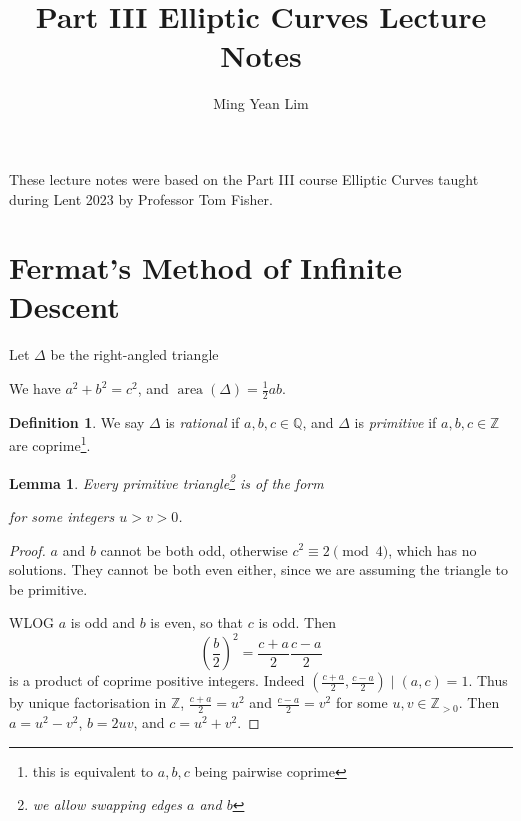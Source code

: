 \documentclass[11pt]{article}
\title{Part III Elliptic Curves Lecture Notes}
\author{Ming Yean Lim}
\theoremstyle{definition}
\newtheorem*{definition*}{Definition}
\theoremstyle{plain}
\newtheorem{lemma}[definition]{Lemma}
\theoremstyle{remark}
\DeclareMathOperator{\area}{area}
\newcommand{\ZZ}{\mathbb{Z}}
\newcommand{\QQ}{\mathbb{Q}}
\begin{document}
\maketitle

\noindent These lecture notes were based on the Part III course Elliptic Curves taught during Lent 2023 by Professor Tom Fisher.

\tableofcontents

\newcommand{\sectionbreak}{\clearpage}

\section{Fermat's Method of Infinite Descent}

Let $\Delta$ be the right-angled triangle
\begin{center}
\end{center}
We have $a^2 + b^2 = c^2$, and $\area(\Delta) = \frac{1}{2} a b$.

\begin{definition*}
    We say $\Delta$ is \emph{rational} if $a, b, c \in \QQ$, and $\Delta$ is \emph{primitive} if $a, b, c \in \ZZ$ are coprime\footnote{this is equivalent to $a, b, c$ being pairwise coprime}.
\end{definition*}

\begin{lemma}\label{lem:1_1}
    Every primitive triangle\footnote{we allow swapping edges $a$ and $b$} is of the form
    \begin{center}
    \end{center}
    for some integers $u > v > 0$.
\end{lemma}
\begin{proof}
    $a$ and $b$ cannot be both odd, otherwise $c^2 \equiv 2 \pmod{4}$, which has no solutions. They cannot be both even either, since we are assuming the triangle to be primitive.

    WLOG $a$ is odd and $b$ is even, so that $c$ is odd. Then
    \begin{equation*}
        \left(\frac{b}{2}\right)^2 = \frac{c+a}{2} \frac{c-a}{2}
    \end{equation*}
    is a product of coprime positive integers. Indeed $(\frac{c+a}{2}, \frac{c-a}{2}) \mid (a, c) = 1$. Thus by unique factorisation in $\ZZ$, $\frac{c+a}{2} = u^2$ and $\frac{c-a}{2} = v^2$ for some $u, v \in \ZZ_{>0}$. Then $a = u^2 - v^2$, $b = 2uv$, and $c = u^2 + v^2$.
\end{proof}
\end{document}
